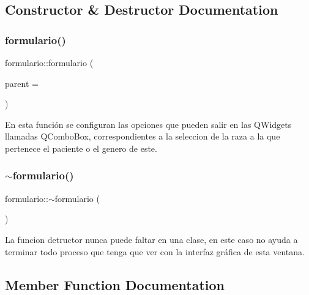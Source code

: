 \subsection{Constructor \& Destructor Documentation}
\mbox{\label{classformulario_af34c9f3ab769a3ea16053537357a8eb2}} 
\subsubsection{\texorpdfstring{formulario()}{formulario()}}
{\footnotesize\ttfamily formulario\+::formulario (\begin{DoxyParamCaption}\item[{Q\+Widget $\ast$}]{parent = {} }\end{DoxyParamCaption})\hspace{0.3cm}{\ttfamily [explicit]}}

En esta función se configuran las opciones que pueden salir en las Q\+Widgets llamadas Q\+Combo\+Box, correspondientes a la seleccion de la raza a la que pertenece el paciente o el genero de este. \mbox{\label{classformulario_a226d2ab871b8816ab3ca146f66e053b4}} 
\subsubsection{\texorpdfstring{$\sim$formulario()}{~formulario()}}
{\footnotesize\ttfamily formulario\+::$\sim$formulario (\begin{DoxyParamCaption}{ }\end{DoxyParamCaption})}

La funcion detructor nunca puede faltar en una clase, en este caso no ayuda a terminar todo proceso que tenga que ver con la interfaz gráfica de esta ventana. 

\subsection{Member Function Documentation}
\mbox{\label{classformulario_abf79e0e6729ee886430517ab1159f03e}} 
